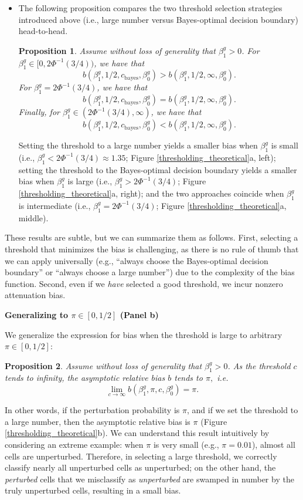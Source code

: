 \documentclass[12pt]{article}
\newtheorem{proposition}{Proposition}
\begin{document}
\begin{itemize}
 \item The following proposition compares the two threshold selection strategies introduced above (i.e., large number versus Bayes-optimal decision boundary) head-to-head.
 \begin{proposition}\label{prop:comparison} Assume without loss of generality that $\beta^g_1 > 0$. For $\beta^g_1 \in [0, 2\Phi^{-1}(3/4))$, we have that $$b(\beta^g_1, 1/2, c_\textrm{bayes}, \beta^g_0) > b(\beta^g_1, 1/2, \infty, \beta^g_0).$$ For $\beta^g_1 = 2\Phi^{-1}(3/4)$, we have that $$ b(\beta^g_1, 1/2, c_\textrm{bayes}, \beta^g_0) = b(\beta^g_1, 1/2, \infty, \beta^g_0).$$ Finally, for $\beta^g_1 \in (2\Phi^{-1}(3/4), \infty)$, we have that
 $$b(\beta^g_1, 1/2, c_\textrm{bayes}, \beta^g_0) < b(\beta^g_1, 1/2, \infty, \beta^g_0).$$
 \end{proposition}
Setting the threshold to a large number yields a smaller bias when $\beta^g_1$ is small (i.e., $\beta^g_1 < 2\Phi^{-1}(3/4) \approx 1.35$; Figure \ref{thresholding_theoretical}a, left); setting the threshold to the Bayes-optimal decision boundary yields a smaller bias when $\beta^g_1$ is large (i.e., $\beta^g_1 > 2\Phi^{-1}(3/4)$; Figure \ref{thresholding_theoretical}a, right); and the two approaches coincide when $\beta^g_1$ is intermediate (i.e., $\beta^g_1 = 2\Phi^{-1}(3/4)$; Figure \ref{thresholding_theoretical}a, middle).
\end{itemize}

These results are subtle, but we can summarize them as follows. First, selecting a threshold that minimizes the bias is challenging, as there is no rule of thumb that we can apply universally (e.g., ``always choose the Bayes-optimal decision boundary'' or ``always choose a large number'') due to the complexity of the bias function. Second, even if we \textit{have} selected a good threshold, we incur nonzero attenuation bias.

\begin{center}
\textbf{Generalizing to $\pi \in [0,1/2]$ (Panel b)}
\end{center}
We generalize the expression for bias when the threshold is large to arbitrary $\pi \in [0,1/2]$:
\begin{proposition}\label{prop:c_limit}
Assume without loss of generality that $\beta^g_1 > 0$. As the threshold $c$ tends to infinity, the asymptotic relative bias $b$ tends to $\pi,$ i.e.
$$ \lim_{ c \to \infty } b(\beta^g_1, \pi, c, \beta^g_0) = \pi.$$
\end{proposition}
In other words, if the perturbation probability is $\pi$, and if we set the threshold to a large number, then the asymptotic relative bias is $\pi$ (Figure \ref{thresholding_theoretical}b). We can understand this result intuitively by considering an extreme example: when $\pi$ is very small (e.g., $\pi = 0.01$), almost all cells are unperturbed. Therefore, in selecting a large threshold, we correctly classify nearly all unperturbed cells as unperturbed; on the other hand, the \textit{perturbed} cells that we misclassify as \textit{unperturbed} are swamped in number by the truly unperturbed cells, resulting in a small bias.
\end{document}
